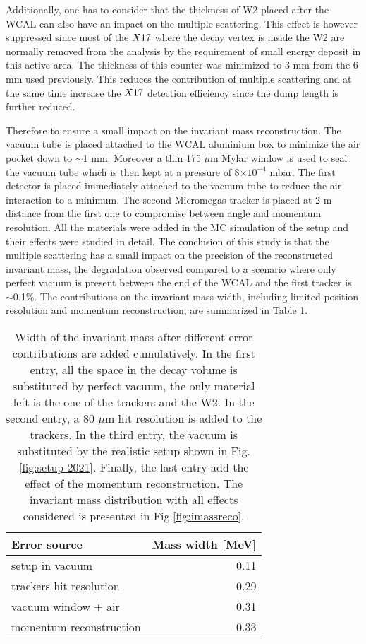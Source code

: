 Additionally, one has to consider that the thickness of W2 placed after the WCAL can also have an impact on the multiple scattering. This effect is however suppressed since most of the $X17$ where the decay vertex is inside the W2 are normally removed from the analysis by the requirement of small energy deposit in this active area. The thickness of this counter was minimized to 3 mm from the 6 mm used previously. This reduces the contribution of multiple scattering and at the same time increase the $X17$ detection efficiency since the dump length is further reduced.

Therefore to ensure a small impact on the invariant mass reconstruction. The vacuum tube is placed attached to the WCAL aluminium box to minimize the air pocket down to $\sim$1 mm. Moreover a thin 175 $\mu$m Mylar window is used to seal the vacuum tube which is then kept at a pressure of 8$\times 10^{-4}$ mbar. The first detector is placed immediately attached to the vacuum tube to reduce the air interaction to a minimum. The second Micromegas tracker is placed at 2 m distance from the first one to compromise between angle and momentum resolution. All the materials were added in the MC simulation of the setup and their effects were studied in detail. The conclusion of this study is that the multiple scattering has a small impact on the precision of the reconstructed invariant mass, the degradation observed compared to a scenario where only perfect vacuum is present between the end of the WCAL and the first tracker is $\sim$0.1\%. The contributions on the invariant mass width, including limited position resolution and momentum reconstruction, are summarized in Table \ref{tab:imass-width}.

\begin{center}
  \begin{table}[bth!]
    \centering
    \begin{tabular}{|l|r|}
      \hline
      Error source & Mass width [MeV]\\
      \hline
      setup in vacuum & 0.11\\
      trackers hit resolution & 0.29\\
      vacuum window + air & 0.31\\
      momentum reconstruction & 0.33\\
      \hline
    \end{tabular}
    \caption[Error budget for the invariant mass in 2021 setup]{Width of the invariant mass after different error contributions are added cumulatively. In the first entry, all the space in the decay volume is substituted by perfect vacuum, the only material left is the one of the trackers and the W2. In the second entry, a 80 $\mu$m hit resolution is added to the trackers. In the third entry, the vacuum is substituted by the realistic setup shown in Fig.\ref{fig:setup-2021}. Finally, the last entry add the effect of the momentum reconstruction. The invariant mass distribution with all effects considered is presented in Fig.\ref{fig:imassreco}.}
    \label{tab:imass-width}    
  \end{table}
\end{center}

